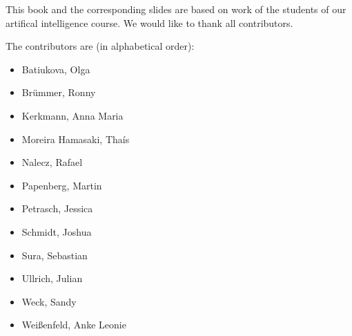 \documentclass[11pt,fleqn]{book} %
\begin{document}


\newpage
\thispagestyle{empty}

\noindent This book and the corresponding slides are based on work of the students of our artifical intelligence course. We would like to thank all contributors.

\noindent
The contributors are (in alphabetical order):
\begin{itemize}
    \item Batiukova, Olga
    \item Brümmer, Ronny
    \item Kerkmann, Anna Maria
    \item Moreira Hamasaki, Thaís
    \item Nalecz, Rafael
    \item Papenberg, Martin
    \item Petrasch, Jessica
    \item Schmidt, Joshua
    \item Sura, Sebastian
    \item Ullrich, Julian
    \item Weck, Sandy
    \item Weißenfeld, Anke Leonie
\end{itemize}





\pagestyle{empty} %

\tableofcontents %

\cleardoublepage %
\end{document}
